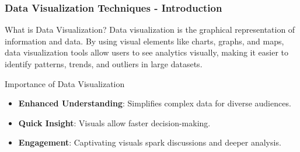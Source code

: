 \documentclass[aspectratio=169]{beamer}
\begin{document}
\begin{frame}[fragile]
    \frametitle{Data Visualization Techniques - Introduction}
    \begin{block}{What is Data Visualization?}
        Data visualization is the graphical representation of information and data.
        By using visual elements like charts, graphs, and maps, data visualization tools allow users to see analytics visually, making it easier to identify patterns, trends, and outliers in large datasets.
    \end{block}
    
    \begin{block}{Importance of Data Visualization}
        \begin{itemize}
            \item \textbf{Enhanced Understanding}: Simplifies complex data for diverse audiences.
            \item \textbf{Quick Insight}: Visuals allow faster decision-making.
            \item \textbf{Engagement}: Captivating visuals spark discussions and deeper analysis.
        \end{itemize}
    \end{block}
\end{frame}
\end{document}
